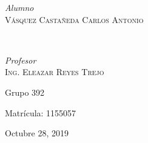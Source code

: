 \documentclass[12pt, letterpaper]{article}
\begin{document}
\begin{titlepage}
{	\begin{minipage}{0.4\textwidth}
		\begin{flushleft}
			\large
			\textit{Alumno}\\
			\textsc{Vásquez Castañeda Carlos Antonio} %
		\end{flushleft}
	\end{minipage}
	~
	\begin{minipage}{0.4\textwidth}
		\begin{flushright}
			\large
			\textit{Profesor}\\
			\textsc{Ing. Eleazar Reyes Trejo} %
		\end{flushright}
	\end{minipage}
	
	
	
	\vfill
	{\large Grupo 392}

	{\large Matrícula: 1155057}
	\vfill
	\vfill %
	
	{\large Octubre 28, 2019} %
	
	
	 
	
	\vfill %
}	
\end{titlepage}

\end{document}
